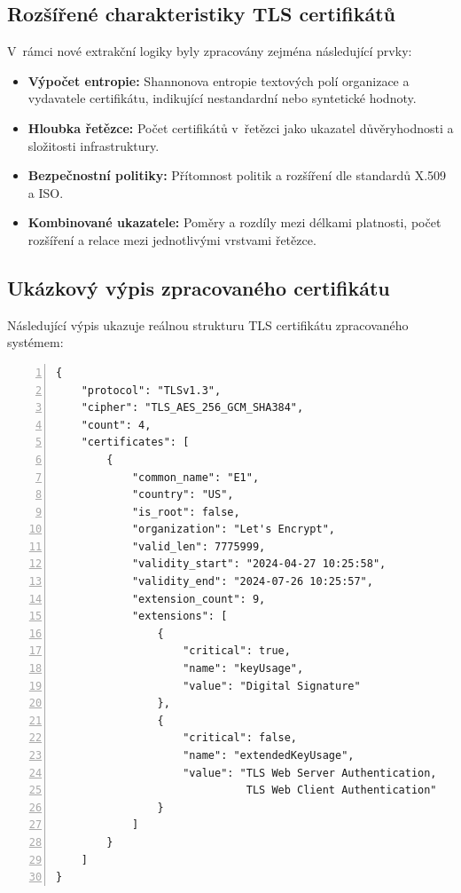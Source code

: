 \subsection*{Rozšířené charakteristiky TLS certifikátů}
V~rámci nové extrakční logiky byly zpracovány zejména následující prvky:

\begin{itemize}
    \item \textbf{Výpočet entropie:} Shannonova entropie textových polí organizace a vydavatele certifikátu, indikující nestandardní nebo syntetické hodnoty.
    \item \textbf{Hloubka řetězce:} Počet certifikátů v~řetězci jako ukazatel důvěryhodnosti a složitosti infrastruktury.
    \item \textbf{Bezpečnostní politiky:} Přítomnost politik a rozšíření dle standardů X.509 a ISO.
    \item \textbf{Kombinované ukazatele:} Poměry a rozdíly mezi délkami platnosti, počet rozšíření a relace mezi jednotlivými vrstvami řetězce.
\end{itemize}

\clearpage

\subsection*{Ukázkový výpis zpracovaného certifikátu}
Následující výpis ukazuje reálnou strukturu TLS certifikátu zpracovaného systémem:

\begin{lstlisting}[basicstyle=\ttfamily\small, breaklines=true, numbers=left, frame=single, caption={Struktura TLS certifikátu}]
{
    "protocol": "TLSv1.3",
    "cipher": "TLS_AES_256_GCM_SHA384",
    "count": 4,
    "certificates": [
        {
            "common_name": "E1",
            "country": "US",
            "is_root": false,
            "organization": "Let's Encrypt",
            "valid_len": 7775999,
            "validity_start": "2024-04-27 10:25:58",
            "validity_end": "2024-07-26 10:25:57",
            "extension_count": 9,
            "extensions": [
                {
                    "critical": true,
                    "name": "keyUsage",
                    "value": "Digital Signature"
                },
                {
                    "critical": false,
                    "name": "extendedKeyUsage",
                    "value": "TLS Web Server Authentication, 
                              TLS Web Client Authentication"
                }
            ]
        }
    ]
}
\end{lstlisting}
\label{tls_cert_example}

